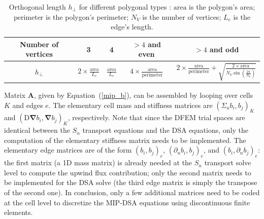 \documentclass[preprint,10pt]{elsarticle}
\newcommand\grad{\boldsymbol{\nabla}}
\newcommand\bs{\boldsymbol}
\renewcommand{\(}{\left(}
\renewcommand{\)}{\right)}
\renewcommand{\[}{\left[}
\renewcommand{\]}{\right]}
\newcommand{\sn}{\ensuremath{S_n}\xspace}
\begin{document}
\begin{table}[H]
  \begin{center}
    \caption{Orthogonal length $h_{\bot}$ for different polygonal types : 
		$\textrm{area}$ is the polygon's area; $\textrm{perimeter}$ is the polygon's perimeter; 
		$N_V$ is the number of vertices; $L_e $ is the edge's length.}
    \begin{tabular}{|c|c|c|c|c|}
      \hline
      Number of vertices & 3 & 4 & $> 4$ and even & $> 4$ and odd \\
      \hline
      $h_{\bot}$ & $2 \times \frac{\textrm{area}}{L_e}$ &
$\frac{\textrm{area}}{L_e}$ & $4\times
\frac{\textrm{area}}{\textrm{perimeter}}$ & $2 \times
      \frac{\textrm{area}}{\textrm{perimeter}}+\sqrt{\frac{2\times
      \textrm{area}}{N_V\sin\(\frac{2\pi}{N_V}\)}}$\\
      \hline
    \end{tabular}
    \label{table_h_bot}
  \end{center}
\end{table}

Matrix $\bs{A}$, given by Equation~\textup {(\ref {mip_b})}, can be assembled by looping over cells $K$
and edges $e$. The elementary cell mass and stiffness matrices are $\(\Sigma_a b_i,b_j\)_K$
and $(\mathrm{D}\grad b_i,\grad b_j)_K$, respectively. Note that since the DFEM trial spaces
are identical between the \sn transport equations and the DSA equations, only the computation of the
elementary stiffness matrix needs to be implemented. The elementary edge matrices are of the form
$(b_i,b_j)_e$, $(\partial_n b_i,b_j)_e$, and $(b_i,\partial_n b_j)_e$: the first matrix (a 1D mass matrix) 
is already needed at the \sn transport solve level to compute the upwind flux contribution; only the 
second matrix needs to be implemented for the DSA solve (the third edge matrix is simply the transpose of 
the second one). In conclusion, only a few additional matrices need to be coded at the cell level to
discretize the MIP-DSA equations using discontinuous finite elements.


\end{document}
